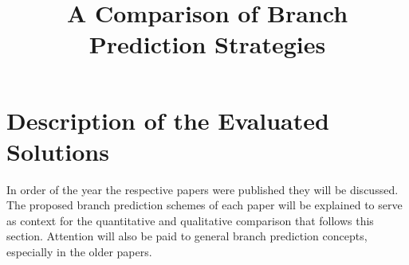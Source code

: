 \documentclass[conference]{IEEEtran}
\begin{document}
%
\title{A Comparison of Branch Prediction Strategies}


\author{
}








\maketitle




\IEEEpeerreviewmaketitle






\section{Description of the Evaluated Solutions}
In order of the year the respective papers were published they will be discussed.
The proposed branch prediction schemes of each paper will be explained to serve as context for the quantitative and qualitative comparison that follows this section.
Attention will also be paid to general branch prediction concepts, especially in the older papers.
\end{document}
